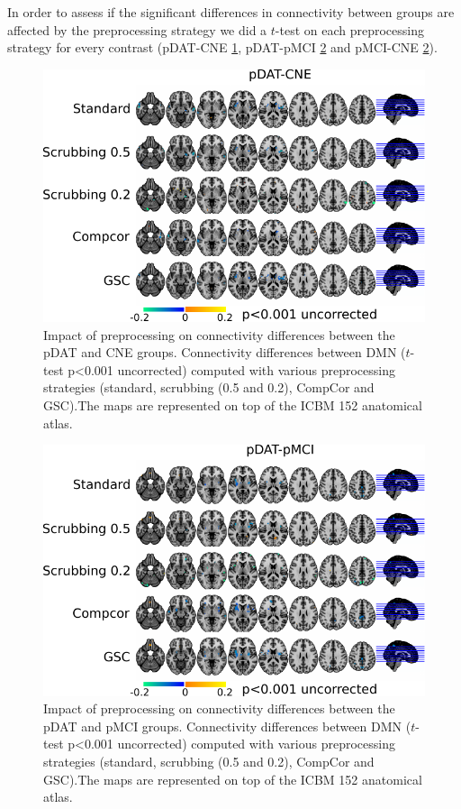 In order to assess if the significant differences in connectivity between groups are affected by the preprocessing strategy we did a $t$-test on each preprocessing strategy for every contrast (pDAT-CNE \ref{fig_impact_pDAT-CNE}, pDAT-pMCI \ref{fig_impact_pDAT-pMCI} and pMCI-CNE \ref{fig_impact_pDAT-pMCI}).

\begin{figure}[H]
\begin{center}
\includegraphics[width=0.60\linewidth]{../figures/scrubbing_impact_pDAT-CNE.pdf}
\end{center}
\caption[Scrubbing impact on group differences]{ Impact of preprocessing on connectivity differences between the pDAT and CNE groups. Connectivity differences between DMN ($t$-test p<0.001 uncorrected) computed with various preprocessing strategies (standard, scrubbing (0.5 and 0.2), CompCor and GSC).The maps are represented on top of the ICBM 152 anatomical atlas.
}
\label{fig_impact_pDAT-CNE}
\end{figure}

\begin{figure}[H]
\begin{center}
\includegraphics[width=0.60\linewidth]{../figures/scrubbing_impact_pDAT-pMCI.pdf}
\end{center}
\caption[Scrubbing impact on group differences]{ Impact of preprocessing on connectivity differences between the pDAT and pMCI groups. Connectivity differences between DMN ($t$-test p<0.001 uncorrected) computed with various preprocessing strategies (standard, scrubbing (0.5 and 0.2), CompCor and GSC).The maps are represented on top of the ICBM 152 anatomical atlas.
}
\label{fig_impact_pDAT-pMCI}
\end{figure}


